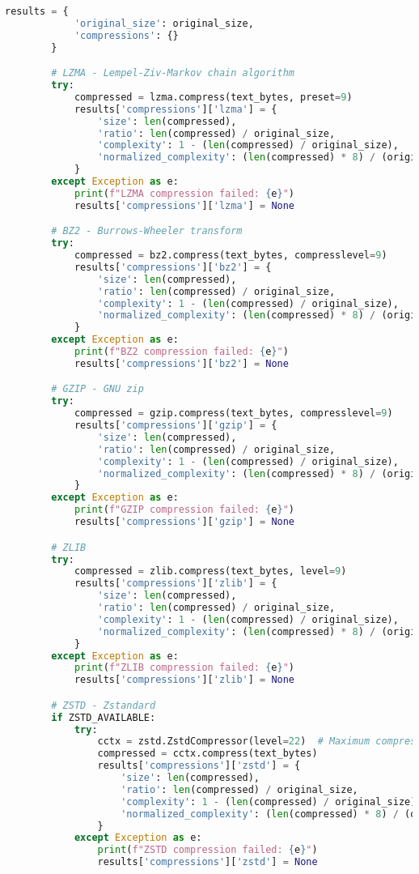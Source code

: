 \documentclass[12pt,a4paper]{report}
\begin{document}
\begin{lstlisting}[language=Python, caption=Complete Compression Analysis Framework]
        results = {
            'original_size': original_size,
            'compressions': {}
        }

        # LZMA - Lempel-Ziv-Markov chain algorithm
        try:
            compressed = lzma.compress(text_bytes, preset=9)
            results['compressions']['lzma'] = {
                'size': len(compressed),
                'ratio': len(compressed) / original_size,
                'complexity': 1 - (len(compressed) / original_size),
                'normalized_complexity': (len(compressed) * 8) / (original_size * 8)
            }
        except Exception as e:
            print(f"LZMA compression failed: {e}")
            results['compressions']['lzma'] = None

        # BZ2 - Burrows-Wheeler transform
        try:
            compressed = bz2.compress(text_bytes, compresslevel=9)
            results['compressions']['bz2'] = {
                'size': len(compressed),
                'ratio': len(compressed) / original_size,
                'complexity': 1 - (len(compressed) / original_size),
                'normalized_complexity': (len(compressed) * 8) / (original_size * 8)
            }
        except Exception as e:
            print(f"BZ2 compression failed: {e}")
            results['compressions']['bz2'] = None

        # GZIP - GNU zip
        try:
            compressed = gzip.compress(text_bytes, compresslevel=9)
            results['compressions']['gzip'] = {
                'size': len(compressed),
                'ratio': len(compressed) / original_size,
                'complexity': 1 - (len(compressed) / original_size),
                'normalized_complexity': (len(compressed) * 8) / (original_size * 8)
            }
        except Exception as e:
            print(f"GZIP compression failed: {e}")
            results['compressions']['gzip'] = None

        # ZLIB
        try:
            compressed = zlib.compress(text_bytes, level=9)
            results['compressions']['zlib'] = {
                'size': len(compressed),
                'ratio': len(compressed) / original_size,
                'complexity': 1 - (len(compressed) / original_size),
                'normalized_complexity': (len(compressed) * 8) / (original_size * 8)
            }
        except Exception as e:
            print(f"ZLIB compression failed: {e}")
            results['compressions']['zlib'] = None

        # ZSTD - Zstandard
        if ZSTD_AVAILABLE:
            try:
                cctx = zstd.ZstdCompressor(level=22)  # Maximum compression
                compressed = cctx.compress(text_bytes)
                results['compressions']['zstd'] = {
                    'size': len(compressed),
                    'ratio': len(compressed) / original_size,
                    'complexity': 1 - (len(compressed) / original_size),
                    'normalized_complexity': (len(compressed) * 8) / (original_size * 8)
                }
            except Exception as e:
                print(f"ZSTD compression failed: {e}")
                results['compressions']['zstd'] = None


\end{lstlisting}
\end{document}
